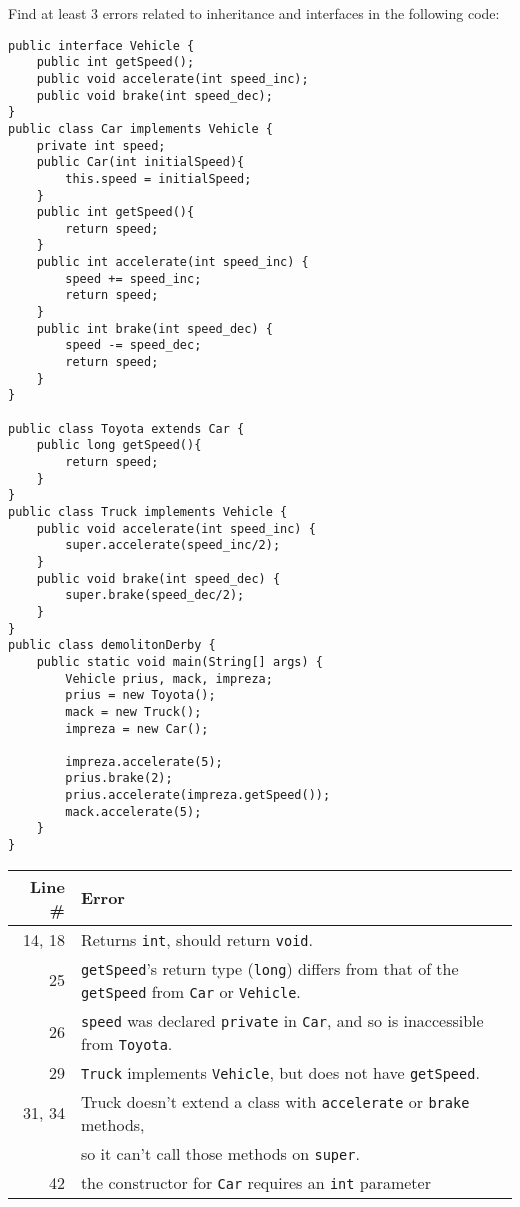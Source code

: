 %
%


Find at least 3 errors related to inheritance and interfaces in the following code:\label{demolition-derby}
\begin{lstlisting}
public interface Vehicle {
	public int getSpeed();
	public void accelerate(int speed_inc);
	public void brake(int speed_dec);
}
public class Car implements Vehicle {
	private int speed;
	public Car(int initialSpeed){
		this.speed = initialSpeed;
	}
	public int getSpeed(){
		return speed;
	}
	public int accelerate(int speed_inc) {
		speed += speed_inc;
		return speed;
	}
	public int brake(int speed_dec) {
		speed -= speed_dec;
		return speed;
	}
}

public class Toyota extends Car {
	public long getSpeed(){
		return speed;
	}
}
public class Truck implements Vehicle {
	public void accelerate(int speed_inc) {
		super.accelerate(speed_inc/2);
	}
	public void brake(int speed_dec) {
		super.brake(speed_dec/2);
	}
}
public class demolitonDerby {
	public static void main(String[] args) {
		Vehicle	prius, mack, impreza;
		prius = new Toyota();
		mack = new Truck();
		impreza = new Car();
		
		impreza.accelerate(5);
		prius.brake(2);
		prius.accelerate(impreza.getSpeed());
		mack.accelerate(5);
	}
}
\end{lstlisting}

\begin{answer}
    \begin{tabular}{r l} 
    Line \# & Error \\\hline
    14, 18  	& Returns {\tt int}, should return {\tt void}.\\
    25  	& {\tt getSpeed}'s return type ({\tt long}) differs from that of the {\tt getSpeed} from {\tt Car} or {\tt Vehicle}.\\
    26  	& {\tt speed} was declared {\tt private} in {\tt Car}, and so is inaccessible from {\tt Toyota}.\\
    29  	& {\tt Truck} implements {\tt Vehicle}, but does not have {\tt getSpeed}.\\
    31, 34  	& Truck doesn't extend a class with {\tt accelerate} or {\tt brake} methods,\\
    		& so it can't call those methods on {\tt super}.\\
    42	&	the constructor for {\tt Car} requires an {\tt int} parameter \\
    \end{tabular}
\end{answer}

